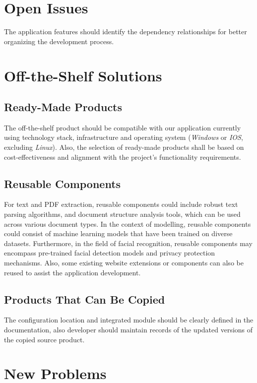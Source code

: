 \documentclass[12pt]{article}
\begin{document}
\section{Open Issues}
 The application features should identify the dependency relationships for better organizing the development process.\\


\section{Off-the-Shelf Solutions}
\subsection{Ready-Made Products}

    The off-the-shelf product should be compatible with our application currently using technology stack, infrastructure and operating system (\textit{Windows} or \textit{IOS}, excluding \textit{Linux}).
    Also, the selection of ready-made products shall be based on cost-effectiveness and alignment with the project's functionality requirements.
    
\subsection{Reusable Components}
For text and PDF extraction, reusable components could include robust text parsing algorithms, and document structure analysis tools, which can be used across various document types. In the context of modelling, reusable components could consist of machine learning models that have been trained on diverse datasets. Furthermore, in the field of facial recognition, reusable components may encompass pre-trained facial detection models and privacy protection mechanisms. Also, some existing website extensions or components can also be reused to assist the application development. \\
\subsection{Products That Can Be Copied}
The configuration location and integrated module should be clearly defined in the documentation, also developer should maintain records of the updated versions of the copied source product.\\


\section{New Problems}
\end{document}
